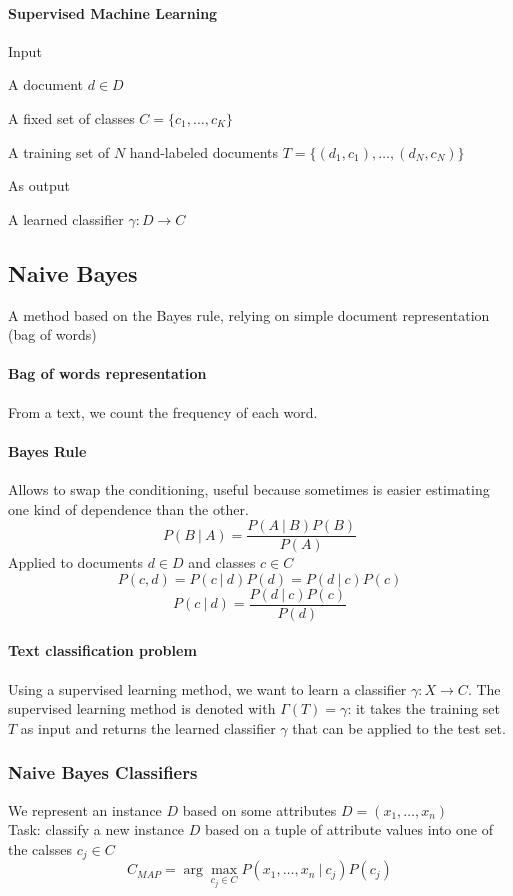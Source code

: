 \documentclass[10pt]{report}
\begin{document}
\paragraph{Supervised Machine Learning} Input \begin{list}{}{}
	\item A document $d\in D$
	\item A fixed set of classes $C=\{c_1,\ldots,c_K\}$
	\item A training set of $N$ hand-labeled documents $T=\{(d_1,c_1),\ldots,(d_N,c_N)\}$
\end{list}
As output\begin{list}{}{}
	\item A learned classifier $\gamma : D \rightarrow C$
\end{list}
\subsection{Naive Bayes}
A method based on the Bayes rule, relying on simple document representation (bag of words)
\paragraph{Bag of words representation} From a text, we count the frequency of each word.
\paragraph{Bayes Rule} Allows to swap the conditioning, useful because sometimes is easier estimating one kind of dependence than the other. $$P(B\:|\:A)=\frac{P(A\:|\:B)P(B)}{P(A)}$$
Applied to documents $d\in D$ and classes $c\in C$
$$P(c,d) = P(c\:|\:d)P(d) = P(d\:|\:c)P(c)$$
$$P(c\:|\:d) = \frac{P(d\:|\:c)P(c)}{P(d)}$$
\paragraph{Text classification problem} Using a supervised learning method, we want to learn a classifier $\gamma:X\rightarrow C$. The supervised learning method is denoted with $\Gamma(T)=\gamma$: it takes the training set $T$ as input and returns the learned classifier $\gamma$ that can be applied to the test set.
\subsubsection{Naive Bayes Classifiers}
We represent an instance $D$ based on some attributes $D=(x_1,\ldots, x_n)$\\Task: classify a new instance $D$ based on a tuple of attribute values into one of the calsses $c_j\in C$
$$C_{MAP}=\arg\max_{c_j\in C} P(x_1,\ldots,x_n\:|\:c_j)P(c_j)$$
\end{document}
